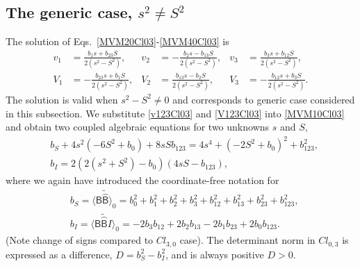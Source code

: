 \documentclass{birkjour}
\newcommand{\cl}[2]{\ensuremath{\mathit{Cl}_{#1,#2}}}
\newcommand{\cliffordconjugate}[1]{\widetilde{\wideparen{#1}}}
\def\B{\mathsf{B}}
\begin{document}
\subsection{The generic case, $s^2\neq S^2$}
The solution of  Eqs.~\eqref{MVM20Cl03}-\eqref{MVM40Cl03} is
\begin{align}
v_1&=\frac{b_1s+b_{23}S}{2(s^2-S^2)}, & v_2&=-\frac{b_{2}s- b_{13}S}{2(s^2-S^2)},&  v_3&=\frac{b_3s+b_{12}S}{2(s^2-S^2)},\label{v123Cl03}\\
V_1&=-\frac{b_{23}s+b_{1}S}{2(s^2-S^2)},
&V_2&=\frac{b_{13}s-b_{2}S}{2(s^2-S^2)},
&V_3&=-\frac{b_{12}s+b_{3}S}{2(s^2-S^2)}.\label{V123Cl03}
\end{align}
The solution is valid when $s^2-S^2\neq 0$ and corresponds to
generic case considered in this subsection. We substitute
\eqref{v123Cl03} and \eqref{V123Cl03} into \eqref{MVM10Cl03} and
obtain two coupled algebraic equations for two unknowns $s$ and
$S$,
\begin{equation}\label{sysA0Cl03}
\begin{split}
& b_{S}+4 s^2 (-6 S^2+b_0)+8 s S b_{123}=4 s^4+(-2 S^2+b_0)^2+b_{123}^2,\\
  & b_{I}=2 (2 (s^2+S^2)-b_0) (4 s S-b_{123}),
\end{split}\end{equation}
where we again have introduced the coordinate-free notation for
\begin{equation}\label{bSbICl03}
\begin{split}
&b_{S}= \langle \B \cliffordconjugate{\B}\rangle_0 =
b_{0}^2+b_{1}^2+b_{2}^2+b_{3}^2+ b_{12}^2+b_{13}^2+b_{23}^2+b_{123}^2,\\
&b_{I}= \langle \B
\cliffordconjugate{\B} I \rangle_0 = -2 b_{3} b_{12}+2 b_{2} b_{13}-2 b_{1} b_{23}+2 b_{0} b_{123}.
\end{split}
\end{equation}
(Note change of signs compared to \cl{3}{0} case). The determinant norm in \cl{0}{3} is expressed as a difference,
$D=b_S^2-b_I^2$, and is always positive $D>0$.
\end{document}
